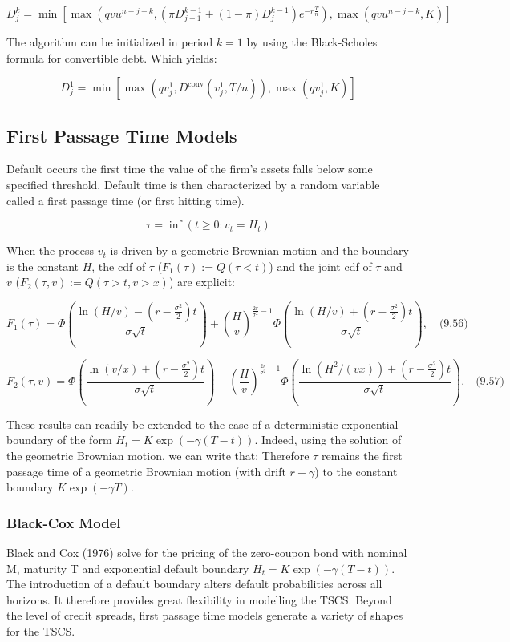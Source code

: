\documentclass[12pt,a4paper]{article}
\begin{document}
$$D_j^k = \min\left[\max\left(qvu^{n-j-k}, (\pi D_{j+1}^{k-1} + (1-\pi)D_j^{k-1})e^{-r\frac{T}{n}}\right), \max(qvu^{n-j-k}, K)\right]$$

The algorithm can be initialized in period $k = 1$ by using the Black-Scholes formula for convertible debt. Which yields:

$$D_j^1 = \min\left[\max\left(qv_j^1, D^{\text{conv}}(v_j^1, T/n)\right), \max(qv_j^1, K)\right]$$

\subsection{First Passage Time Models}

Default occurs the first time the value of the firm's assets falls below some specified threshold. Default time is then characterized by a random variable called a first passage time (or first hitting time).

$$\tau = \inf(t \geq 0: v_t = H_t)$$

When the process $v_t$ is driven by a geometric Brownian motion and the boundary is the constant $H$, the cdf of $\tau$ ($F_1(\tau) := Q(\tau < t)$) and the joint cdf of $\tau$ and $v$ ($F_2(\tau, v) := Q(\tau > t, v > x)$) are explicit:

$$F_1(\tau) = \Phi\left(\frac{\ln(H/v) - (r - \frac{\sigma^2}{2})t}{\sigma\sqrt{t}}\right) + \left(\frac{H}{v}\right)^{\frac{2r}{\sigma^2}-1}\Phi\left(\frac{\ln(H/v) + (r - \frac{\sigma^2}{2})t}{\sigma\sqrt{t}}\right), \quad \text{(9.56)}$$

$$F_2(\tau, v) = \Phi\left(\frac{\ln(v/x) + (r - \frac{\sigma^2}{2})t}{\sigma\sqrt{t}}\right) - \left(\frac{H}{v}\right)^{\frac{2r}{\sigma^2}-1}\Phi\left(\frac{\ln(H^2/(vx)) + (r - \frac{\sigma^2}{2})t}{\sigma\sqrt{t}}\right). \quad \text{(9.57)}$$

These results can readily be extended to the case of a deterministic exponential boundary of the form $H_t = K\exp(-\gamma(T - t))$. Indeed, using the solution of the geometric Brownian motion, we can write that: Therefore $\tau$ remains the first passage time of a geometric Brownian motion (with drift $r - \gamma$) to the constant boundary $K\exp(-\gamma T)$.

\subsubsection{Black-Cox Model }
Black and Cox (1976) solve for the pricing of the zero-coupon bond with nominal M, maturity T 
and exponential default boundary $H_t = K\exp(-\gamma(T - t))$.
The introduction of a default boundary alters default probabilities across all horizons. It therefore 
provides great flexibility in modelling the TSCS. Beyond the level of credit spreads, first passage 
time models generate a variety of shapes for the TSCS.
\end{document}
